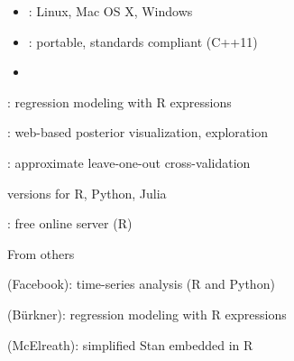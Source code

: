 \documentclass[10pt]{report}
\begin{document}
%
\vspace*{-2pt}
\begin{itemize}
\item {}:  Linux, Mac OS X, Windows
\item {}: {\small portable, standards compliant (C++11)}
\item {}
\end{itemize}


%
\begin{subitemize}
\item {}
\begin{subsubitemize}
 \item {}: regression modeling with R expressions
 \item {}: web-based posterior visualization, exploration
 \item {}:  approximate leave-one-out cross-validation
\end{subsubitemize}
\item {}
\begin{subsubitemize}
\item {} versions for R, Python, Julia
\item {}: free online server (R)
\end{subsubitemize}
\item From others
\begin{subsubitemize}
\item {} (Facebook): time-series analysis (R and Python)
\item {} (B\"urkner): regression modeling with R expressions
\item {} (McElreath): simplified Stan embedded in R
\end{subsubitemize}
\end{subitemize}
\end{document}
